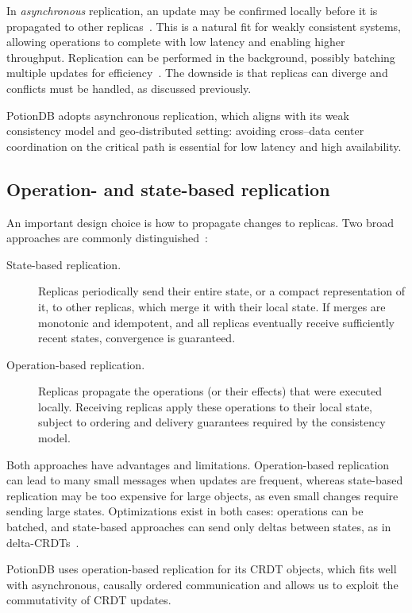 In \emph{asynchronous} replication, an update may be confirmed locally before it
is propagated to other replicas~\cite{tanenbaum2006distributed}. This is a natural
fit for weakly consistent systems, allowing operations to complete with low
latency and enabling higher throughput. Replication can be performed in the
background, possibly batching multiple updates for efficiency~\cite{dynamo,occic2012causal}.
The downside is that replicas can diverge and conflicts must be handled, as
discussed previously.

PotionDB adopts asynchronous replication, which aligns with its weak consistency
model and geo-distributed setting: avoiding cross–data center coordination on
the critical path is essential for low latency and high availability.

\subsection{Operation- and state-based replication}

An important design choice is how to propagate changes to replicas. Two broad
approaches are commonly distinguished~\cite{crdt}:

\begin{description}
  \item[State-based replication.] Replicas periodically send their entire state,
        or a compact representation of it, to other replicas, which merge it with
        their local state. If merges are monotonic and idempotent, and all
        replicas eventually receive sufficiently recent states, convergence is
        guaranteed.
  \item[Operation-based replication.] Replicas propagate the operations (or
        their effects) that were executed locally. Receiving replicas apply these
        operations to their local state, subject to ordering and delivery
        guarantees required by the consistency model.
\end{description}

Both approaches have advantages and limitations. Operation-based replication can
lead to many small messages when updates are frequent, whereas state-based
replication may be too expensive for large objects, as even small changes require
sending large states. Optimizations exist in both cases: operations can be
batched, and state-based approaches can send only deltas between states, as in
delta-CRDTs~\cite{stateCRDT,deltaAlmeida}.

PotionDB uses operation-based replication for its CRDT objects, which fits well
with asynchronous, causally ordered communication and allows us to exploit the
commutativity of CRDT updates.

